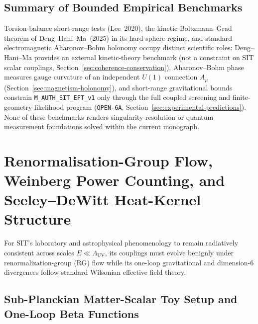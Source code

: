 \subsection{Summary of Bounded Empirical Benchmarks}

Torsion-balance short-range tests (Lee~2020), the kinetic Boltzmann--Grad theorem of Deng--Hani--Ma~(2025) in its hard-sphere regime, and standard electromagnetic Aharonov--Bohm holonomy occupy distinct scientific roles: Deng--Hani--Ma provides an external kinetic-theory benchmark (not a constraint on SIT scalar couplings, Section~\ref{sec:coherence-conservation}), Aharonov--Bohm phase measures gauge curvature of an independent $U(1)$ connection $A_\mu$ (Section~\ref{sec:magnetism-holonomy}), and short-range gravitational bounds constrain \texttt{M\_AUTH\_SIT\_EFT\_v1} only through the full coupled screening and finite-geometry likelihood program (\texttt{OPEN-6A}, Section~\ref{sec:experimental-predictions}). None of these benchmarks renders singularity resolution or quantum measurement foundations solved within the current monograph.



\section{Renormalisation-Group Flow, Weinberg Power Counting, and Seeley--DeWitt Heat-Kernel Structure}
\label{sec:rg-heat-kernel}

For SIT's laboratory and astrophysical phenomenology to remain radiatively consistent across scales $E \ll \Lambda_{\mathrm{UV}}$, its couplings must evolve benignly under renormalization-group (RG) flow while its one-loop gravitational and dimension-6 divergences follow standard Wilsonian effective field theory.

\subsection{Sub-Planckian Matter-Scalar Toy Setup and One-Loop Beta Functions}

